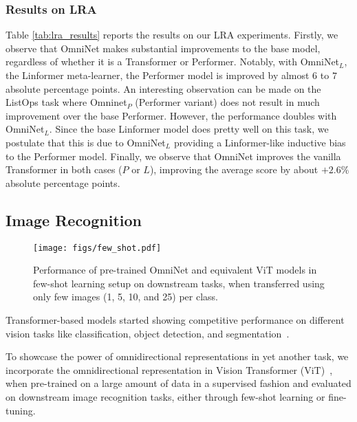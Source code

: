 \documentclass{article}
\begin{document}
\subsubsection{Results on LRA}
Table \ref{tab:lra_results} reports the results on our LRA experiments. Firstly, we observe that OmniNet makes substantial improvements to the base model, regardless of whether it is a Transformer or Performer. Notably, with OmniNet$_L$, the Linformer meta-learner, the Performer model is improved by almost $6$ to $7$ absolute percentage points. An interesting observation can be made on the ListOps task where Omninet$_P$ (Performer variant) does not result in much improvement over the base Performer. However, the performance doubles with OmniNet$_L$. Since the base Linformer model does pretty well on this task, we postulate that this is due to OmniNet$_L$ providing a Linformer-like inductive bias to the Performer model. Finally, we observe that OmniNet improves the vanilla Transformer in both cases ($P$ or $L$),  improving the average score by about $+2.6\%$ absolute percentage points.
\nocite{langley00}

\subsection{Image Recognition}

\begin{figure*}[t!]
\vspace{-10pt}
\begin{center}
\texttt{[image: figs/few\_shot.pdf]}
\end{center}
\vspace{-15pt}
\caption{Performance of pre-trained OmniNet and equivalent ViT models in few-shot learning setup on downstream tasks, when transferred using only few images (1, 5, 10, and  25) per class.}
\label{fig:OmniNet-ViT-few_shot}
\vspace{-15pt}
\end{figure*}

Transformer-based models started showing competitive performance on different vision tasks like classification, object detection, and segmentation~\citep{chen2020generative, dosovitskiy2020image, carion2020end, kumar2021colorization}.

To showcase the power of omnidirectional representations in yet another task, we incorporate the omnidirectional representation in Vision Transformer (ViT)~\citep{dosovitskiy2020image}, when pre-trained on a large amount of data in a supervised fashion and evaluated on downstream image recognition tasks, either through few-shot learning or fine-tuning. 
\end{document}
